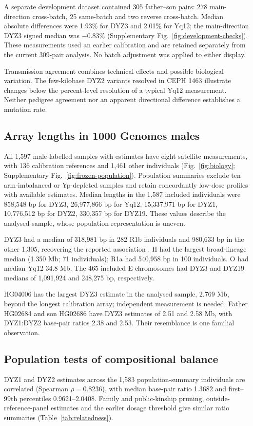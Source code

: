 \documentclass[pdflatex,sn-nature]{sn-jnl}
\begin{document}
A separate development dataset contained 305 father--son pairs: 278 main-direction cross-batch, 25 same-batch and two reverse cross-batch. Median absolute differences were 1.93\% for DYZ3 and 2.01\% for Yq12; the main-direction DYZ3 signed median was $-0.83\%$ (Supplementary Fig.~\ref{fig:development-checks}). These measurements used an earlier calibration and are retained separately from the current 309-pair analysis. No batch adjustment was applied to either display.

Transmission agreement combines technical effects and possible biological variation. The few-kilobase DYZ2 variants resolved in CEPH 1463 \cite{Porubsky2025} illustrate changes below the percent-level resolution of a typical Yq12 measurement. Neither pedigree agreement nor an apparent directional difference establishes a mutation rate.

\subsection{Array lengths in 1000 Genomes males}\label{sec:res-catalog}
All 1,597 male-labelled samples with estimates have eight satellite measurements, with 136 calibration references and 1,461 other individuals (Fig.~\ref{fig:biology}; Supplementary Fig.~\ref{fig:frozen-population}). Population summaries exclude ten arm-imbalanced or Yp-depleted samples and retain concordantly low-dose profiles with available estimates. Median lengths in the 1,587 included individuals were 858,548 bp for DYZ3, 26,977,866 bp for Yq12, 15,337,971 bp for DYZ1, 10,776,512 bp for DYZ2, 330,357 bp for DYZ19. These values describe the analysed sample, whose population representation is uneven.

DYZ3 had a median of 318,981 bp in 282 R1b individuals and 980,633 bp in the other 1,305, recovering the reported association \cite{Hallast2023}. H had the largest broad-lineage median (1.350 Mb; 71 individuals); R1a had 540,958 bp in 100 individuals. O had median Yq12 34.8 Mb. The 465 included E chromosomes had DYZ3 and DYZ19 medians of 1,091,924 and 248,275 bp, respectively.

HG04006 has the largest DYZ3 estimate in the analysed sample, 2.769 Mb, beyond the longest calibration array; independent measurement is needed. Father HG02684 and son HG02686 have DYZ3 estimates of 2.51 and 2.58 Mb, with DYZ1:DYZ2 base-pair ratios 2.38 and 2.53. Their resemblance is one familial observation.

\subsection{Population tests of compositional balance}\label{sec:res-balance}
DYZ1 and DYZ2 estimates across the 1,583 population-summary individuals are correlated (Spearman $\rho=0.8236$), with median base-pair ratio 1.3682 and first--99th percentiles 0.9621--2.0408. Family and public-kinship pruning, outside-reference-panel estimates and the earlier dosage threshold give similar ratio summaries (Table~\ref{tab:relatedness}).
\end{document}
